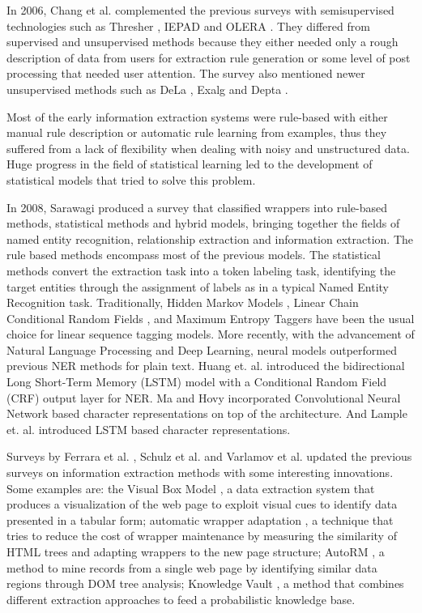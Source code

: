 \documentclass{nle}
\begin{document}
In 2006, Chang et al. \cite{Chang2006} complemented the previous surveys with semisupervised 
technologies such as Thresher \cite{Hogue2005}, IEPAD \cite{Chang2001} and 
OLERA \cite{Chang2004}. They differed from supervised 
and unsupervised methods because they either needed only a rough description of
data from users for extraction rule generation or some level of post processing
that needed user attention. The survey also mentioned newer unsupervised methods
such as DeLa \cite{Wang2003}, Exalg \cite{Arasu2003} and Depta \cite{Zhai2005}.

Most of the early information extraction systems were rule-based with either 
manual rule description or automatic rule learning from examples, thus they
suffered from a lack of flexibility when dealing with noisy and unstructured data.
Huge progress in the field of statistical learning led to the development of
statistical models that tried to solve this problem.

In 2008, Sarawagi \cite{Sarawagi2008} produced a survey that classified wrappers into
rule-based methods, statistical methods and hybrid models, bringing together 
the fields of named entity recognition, relationship extraction and information extraction. 
The rule based methods encompass most of the 
previous models. The statistical methods convert the extraction task into a token labeling 
task, identifying the target entities through the assignment of labels as in a typical 
Named Entity Recognition task. Traditionally, Hidden Markov Models \cite{Leek1997,Freitag1999}, 
Linear Chain Conditional Random Fields \cite{Lafferty2001}, and Maximum Entropy Taggers 
\cite{McCallum2000} have been the usual choice for linear sequence tagging models.
More recently, with the advancement of Natural Language Processing and Deep Learning, 
neural models outperformed previous NER methods for plain text. Huang et. al. \cite{Huang2015} introduced the 
bidirectional Long Short-Term Memory (LSTM) model with a Conditional Random Field (CRF) output layer
for NER. Ma and Hovy \cite{Ma2016} incorporated Convolutional Neural Network based character representations 
on top of the architecture. And Lample et. al. \cite{Lample2016} introduced
LSTM based character representations. 

Surveys by Ferrara et al. \cite{Ferrara2014}, Schulz et al. \cite{Schulz2016} and 
Varlamov et al. \cite{Varlamov2016} updated the previous surveys on information 
extraction methods with some interesting innovations. 
Some examples are: the Visual Box Model \cite{Krupl2005}, a data extraction system that produces 
a visualization of the web page to exploit visual cues to identify data presented in a tabular form;
automatic wrapper adaptation \cite{Ferrara2011}, a technique that tries to reduce the cost of 
wrapper maintenance by measuring the similarity of HTML trees and adapting
wrappers to the new page structure; AutoRM \cite{Shi2015}, a method to mine
records from a single web page by identifying similar data regions through DOM
tree analysis; Knowledge Vault \cite{Dong2014}, a method that combines different 
extraction approaches to feed a probabilistic knowledge base.
\end{document}
